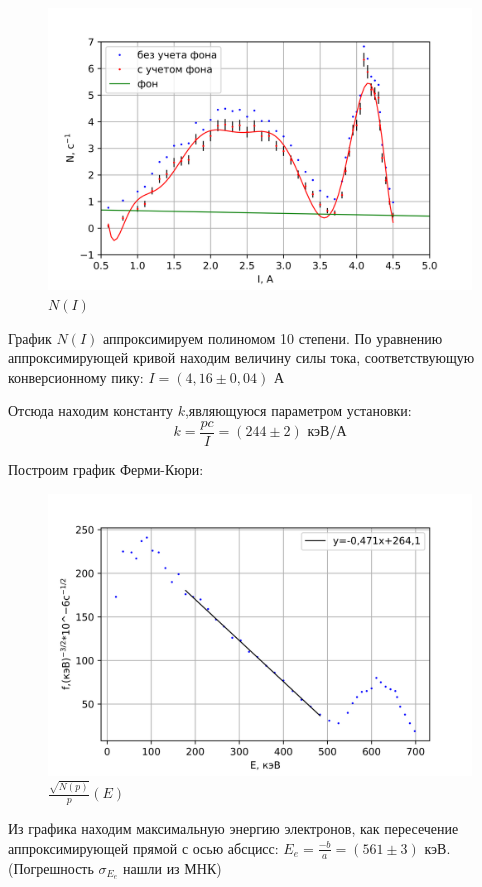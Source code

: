 \documentclass[a4paper,12pt]{report}
\begin{document}
	\begin{figure}[H]
		\centering
		\includegraphics[width=0.7\linewidth]{N(I).png}
		\caption{$N(I)$}
		\label{ris mu}
	\end{figure}

График $N(I)$ аппроксимируем полиномом 10 степени. По уравнению аппроксимирующей кривой находим величину силы тока, соответствующую конверсионному пику: $I = (4,16 \pm 0,04)$ А

Отсюда находим константу $k$,являющуюся параметром установки:
\begin{equation*}
    k = \frac{pc}{I} = (244\pm 2) \text{ кэВ/А}
\end{equation*}

Построим график Ферми-Кюри:

	\begin{figure}[H]
		\centering
		\includegraphics[width=0.7\linewidth]{f(E).png}
		\caption{$\frac{\sqrt{N(p)}}{p}(E)$}
		\label{ris mu}
	\end{figure}

Из графика находим максимальную энергию электронов, как пересечение аппроксимирующей прямой с осью абсцисс: $E_{e} = \frac{-b}{a} = (561\pm3) $ кэВ. (Погрешность $\sigma_{E_{e}}$ нашли из МНК)
\end{document}
